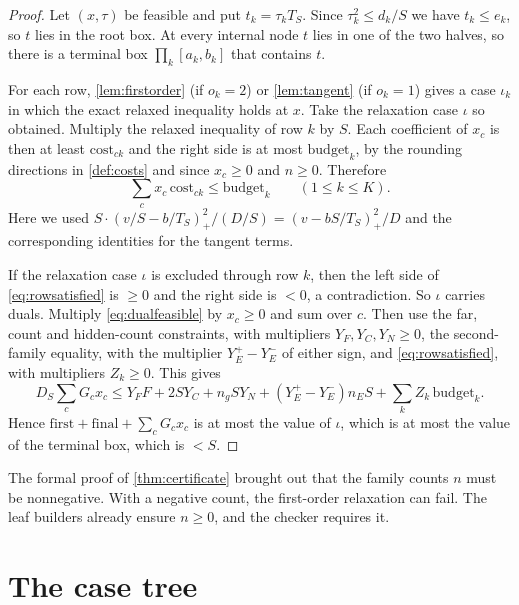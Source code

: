 \documentclass[11pt]{amsart}
\numberwithin{equation}{section}
\theoremstyle{plain}
\theoremstyle{definition}
\theoremstyle{remark}
\newcommand{\1}{\mathbf{1}}
\begin{document}
\begin{proof}
Let $(x,\tau)$ be feasible and put $t_k=\tau_kT_S$. Since $\tau_k^2\le d_k/S$ we have $t_k\le e_k$,
so $t$ lies in the root box. At every internal node $t$ lies in one of the two halves, so there is
a terminal box $\prod_k[a_k,b_k]$ that contains $t$.

For each row, \cref{lem:firstorder} (if $o_k=2$) or \cref{lem:tangent} (if $o_k=1$) gives a case
$\iota_k$ in which the exact relaxed inequality holds at $x$. Take the relaxation case $\iota$ so
obtained. Multiply the relaxed inequality of row $k$ by $S$. Each coefficient of $x_c$ is then at
least $\mathrm{cost}_{ck}$ and the right side is at most $\mathrm{budget}_k$, by the rounding
directions in \cref{def:costs} and since $x_c\ge0$ and $n\ge0$. Therefore
\begin{equation}\label{eq:rowsatisfied}
  \sum_cx_c\,\mathrm{cost}_{ck}\le\mathrm{budget}_k\qquad(1\le k\le K).
\end{equation}
Here we used $S\cdot(v/S-b/T_S)_+^2/(D/S)=(v-bS/T_S)_+^2/D$ and the corresponding identities for
the tangent terms.

If the relaxation case $\iota$ is excluded through row $k$, then the left side of \eqref{eq:rowsatisfied} is $\ge0$
and the right side is $<0$, a contradiction. So $\iota$ carries duals. Multiply
\eqref{eq:dualfeasible} by $x_c\ge0$ and sum over $c$. Then use the far, count and hidden-count
constraints, with multipliers $Y_F,Y_C,Y_N\ge0$, the second-family equality, with the multiplier
$Y_E^+-Y_E^-$ of either sign, and \eqref{eq:rowsatisfied}, with multipliers $Z_k\ge0$. This gives
\[
  D_S\sum_cG_cx_c\le Y_FF+2SY_C+n_gSY_N+(Y_E^+-Y_E^-)n_ES+\sum_kZ_k\,\mathrm{budget}_k .
\]
Hence $\mathrm{first}+\mathrm{final}+\sum_cG_cx_c$ is at most the value of $\iota$, which is at most
the value of the terminal box, which is $<S$.
\end{proof}

\begin{remark}
The formal proof of \cref{thm:certificate} brought out that the family counts $n$ must be
nonnegative. With a negative count, the first-order relaxation can fail.
The leaf builders already ensure $n\ge0$, and the checker requires it.
\end{remark}

\section{The case tree}\label{sec:casetree}
\end{document}
